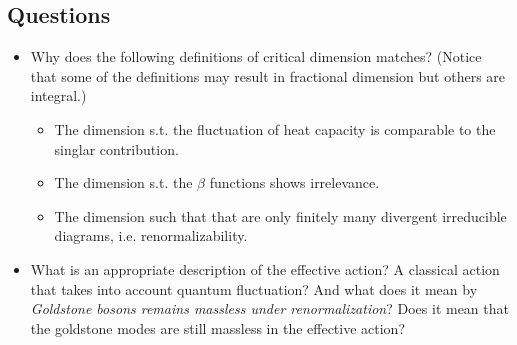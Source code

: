 \documentclass{article}
\begin{document}
\subsection{Questions}

\begin{itemize}
    \item Why does the following definitions of critical dimension matches?
    (Notice that some of the definitions may result in fractional dimension but others are integral.)
    \begin{itemize}
        \item The dimension s.t. the fluctuation of heat capacity is comparable to the singlar contribution.
        \item The dimension s.t. the $\beta$ functions shows irrelevance.
        \item The dimension such that that are only finitely many divergent irreducible diagrams, i.e. renormalizability.
    \end{itemize}
    \item What is an appropriate description of the effective action?
    A classical action that takes into account quantum fluctuation?
    And what does it mean by \textit{Goldstone bosons remains massless under renormalization}?
    Does it mean that the goldstone modes are still massless in the effective action?
\end{itemize}

% 
% 
\end{document}
